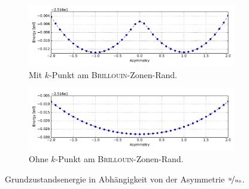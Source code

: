 \begin{frame}
\begin{figure}
	\centering
	\begin{subfigure}{.85\textwidth}
	\centering
	\includegraphics[width = \textwidth]{Images/polyacetylene/convergence/Potential_with_asymmetry}
	\caption{Mit $k$-Punkt am \textsc{Brillouin}-Zonen-Rand.}
	\label{image_potential_with_asymmetry}
	\end{subfigure}
	\begin{subfigure}{.85\textwidth}
	\centering
	\includegraphics[width = \textwidth]{Images/polyacetylene/convergence/Potential_without_asymmetry}
	\caption{Ohne $k$-Punkt am \textsc{Brillouin}-Zonen-Rand.}
	\label{image_potential_without_asymmetry}
	\end{subfigure}
	\caption{Grundzustandsenergie in Abhängigkeit von der Asymmetrie $\nicefrac{u}{u_0}$.}
\end{figure}
\end{frame}

